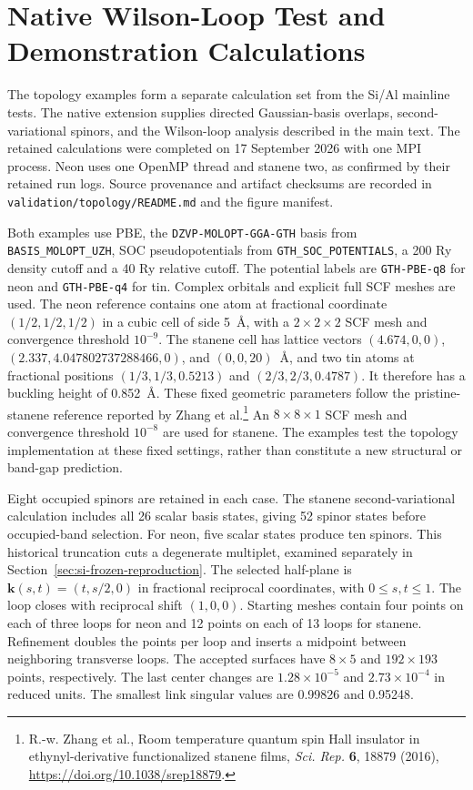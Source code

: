 \documentclass[11pt]{article}
\begin{document}
\section{Native Wilson-Loop Test and Demonstration Calculations}

The topology examples form a separate calculation set from the Si/Al
mainline tests. The native extension supplies directed Gaussian-basis
overlaps, second-variational spinors, and the Wilson-loop analysis described
in the main text. The retained calculations were completed on
17 September 2026 with one MPI process. Neon uses one OpenMP thread
and stanene two, as confirmed by their retained run logs. Source
provenance and artifact checksums are recorded in
\texttt{validation/topology/README.md} and the figure manifest.

Both examples use PBE, the \texttt{DZVP-MOLOPT-GGA-GTH} basis from
\texttt{BASIS\_MOLOPT\_UZH}, SOC pseudopotentials from
\texttt{GTH\_SOC\_POTENTIALS}, a 200 Ry density cutoff and a 40 Ry relative
cutoff. The potential labels are \texttt{GTH-PBE-q8} for neon and
\texttt{GTH-PBE-q4} for tin. Complex orbitals and explicit full SCF meshes
are used. The neon reference contains one atom at fractional coordinate
$(1/2,1/2,1/2)$ in a cubic cell of side 5~\AA, with a $2\times2\times2$
SCF mesh and convergence threshold $10^{-9}$. The stanene cell has lattice
vectors $(4.674,0,0)$, $(2.337,4.047802737288466,0)$, and $(0,0,20)$~\AA,
and two tin atoms at fractional positions $(1/3,1/3,0.5213)$ and
$(2/3,2/3,0.4787)$. It therefore has a buckling height of 0.852~\AA.
These fixed geometric parameters follow the pristine-stanene reference
reported by Zhang et al.\footnote{R.-w. Zhang et al., Room temperature
quantum spin Hall insulator in ethynyl-derivative functionalized stanene
films, \emph{Sci. Rep.} \textbf{6}, 18879 (2016),
\url{https://doi.org/10.1038/srep18879}.}
An $8\times8\times1$ SCF mesh and convergence threshold $10^{-8}$ are used
for stanene. The examples test the topology implementation at these fixed
settings, rather than constitute a new structural or band-gap prediction.

Eight occupied spinors are retained in each case. The stanene
second-variational calculation includes all 26 scalar basis states, giving
52 spinor states before occupied-band selection. For neon, five scalar
states produce ten spinors. This historical truncation cuts a degenerate
multiplet, examined separately in Section~\ref{sec:si-frozen-reproduction}.
The selected half-plane is
$\mathbf k(s,t)=(t,s/2,0)$ in fractional reciprocal coordinates, with
$0\leq s,t\leq1$. The loop closes with reciprocal shift $(1,0,0)$.
Starting meshes contain four points on each of three loops for neon and
12 points on each of 13 loops for stanene. Refinement doubles the points
per loop and inserts a midpoint between neighboring transverse loops.
The accepted surfaces have $8\times5$ and $192\times193$ points,
respectively. The last center changes are $1.28\times10^{-5}$ and
$2.73\times10^{-4}$ in reduced units. The smallest link singular values
are 0.99826 and 0.95248.
\end{document}
